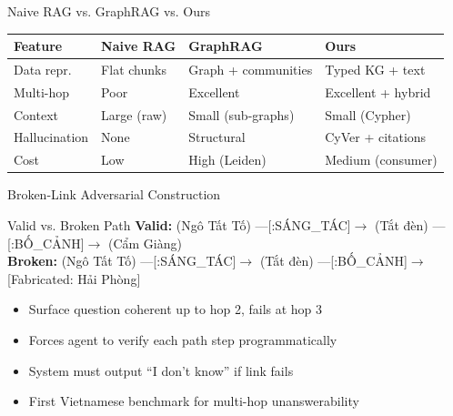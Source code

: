 \documentclass[aspectratio=169]{beamer}
\newcommand{\con}[1]{\textcolor{negative}{#1}}
\newcommand{\HL}[1]{\textcolor{emphasis}{#1}}
\begin{document}
\begin{frame}{Naive RAG vs. GraphRAG vs. Ours}
\vspace{4pt}
\begin{center}
\small
\begin{tabular}{llll}
\toprule
\textbf{Feature} & \textbf{Naive RAG} & \textbf{GraphRAG} & \textbf{Ours} \\
\midrule
Data repr. & Flat chunks & Graph + communities & Typed KG + text \\
Multi-hop & Poor & Excellent & Excellent + hybrid \\
Context & Large (raw) & Small (sub-graphs) & Small (Cypher) \\
Hallucination & None & Structural & CyVer + citations \\
Cost & Low & High (Leiden) & Medium (consumer) \\
\bottomrule
\end{tabular}
\end{center}
\end{frame}

\begin{frame}{Broken-Link Adversarial Construction}
\begin{exampleblock}{Valid vs. Broken Path}
\textbf{Valid:} (Ngô Tất Tố) ---[:SÁNG\_TÁC]$\rightarrow$ (Tắt đèn) ---[:BỐ\_CẢNH]$\rightarrow$ (Cẩm Giàng)\\[4pt]
\textbf{Broken:} (Ngô Tất Tố) ---[:SÁNG\_TÁC]$\rightarrow$ (Tắt đèn) ---[:BỐ\_CẢNH]$\rightarrow$ \con{[Fabricated: Hải Phòng]}
\end{exampleblock}
\vspace{0.3em}
\begin{itemize}
  \item Surface question coherent up to hop 2, fails at hop 3
  \item Forces agent to verify each path step programmatically
  \item System must output ``I don't know'' if link fails
  \item \HL{First Vietnamese benchmark} for multi-hop unanswerability
\end{itemize}
\end{frame}
\end{document}
